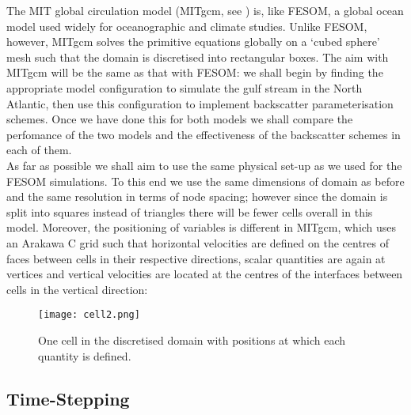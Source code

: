  The MIT global circulation model (MITgcm, see \cite{mit_2018}) is, like FESOM, a global ocean model used widely for oceanographic and climate studies. Unlike FESOM, however, MITgcm solves the primitive equations globally on a `cubed sphere' mesh such that the domain is discretised into rectangular boxes. The aim with MITgcm will be the same as that with FESOM: we shall begin by finding the appropriate model configuration to simulate the gulf stream in the North Atlantic, then use this configuration to implement backscatter parameterisation schemes. Once we have done this for both models we shall compare the perfomance of the two models and the effectiveness of the backscatter schemes in each of them. \\
 \linebreak
As far as possible we shall aim to use the same physical set-up as we used for the FESOM simulations. To this end we use the same dimensions of domain as before and the same resolution in terms of node spacing; however since the domain is split into squares instead of triangles there will be fewer cells overall in this model. Moreover, the positioning of variables is different in MITgcm, which uses an Arakawa C grid such that horizontal velocities are defined on the centres of faces between cells in their respective directions, scalar quantities are again at vertices and vertical velocities are located at the centres of the interfaces between cells in the vertical direction:
 \begin{figure}[H]
  \centering
  \texttt{[image: cell2.png]}
    \captionsetup{width=.8\linewidth}
  \caption{\footnotesize One cell in the discretised domain with positions at which each quantity is defined.}
\end{figure}

\subsection{Time-Stepping}

